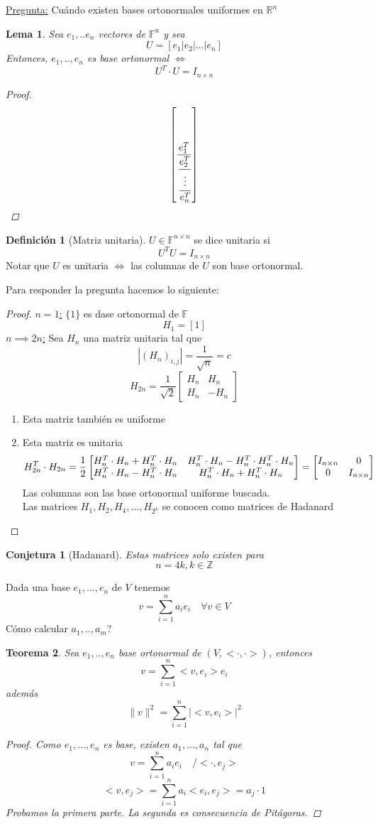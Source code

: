 \documentclass[11pt]{book}
\newcommand{\set}[1]{\mathbb{#1}}
\newtheorem{thm}{Teorema}[section]
\newtheorem{lem}[thm]{Lema}
\newtheorem*{conj}{Conjetura}
\theoremstyle{definition}
\newtheorem{defn}{Definición}[section]
\begin{document}
\underline{Pregunta:} Cuándo existen bases ortonormales uniformes en $\set{R}^n$
\begin{lem}
	Sea $e_1,..e_n$ vectores de $\set{F}^n$ y sea 
	\[U=\left[e_1|e_2|...|e_n\right]\]
	Entonces, $e_1,..,e_n$ es base ortonormal $\iff$
	\[U^T\cdot U=I_{n\times n}\]
	\begin{proof}
		\[\left[\frac{e_1^T}{\cfrac{e_2^T}{\cfrac{\vdots}{e_n^T}}}\right]\]
	\end{proof}
\end{lem}
\begin{defn}[Matriz unitaria]
	$U\in\set{F}^{n\times n}$ se dice unitaria si
	\[U^TU=I_{n\times n}\]
	Notar que $U$ es unitaria $\iff$ las columnas de $U$ son base ortonormal.
\end{defn}
Para responder la pregunta hacemos lo siguiente:
\begin{proof}
	\underline{$n=1$:} $\{1\}$ es dase ortonormal de $\set{F}$
	\[H_1=[1]\]
	\underline{$n\implies 2n$:} Sea $H_n$ una matriz unitaria tal que
	\[|(H_n)_{i,j}|=\frac{1}{\sqrt{n}}=c\]
	\[H_{2n}=\frac{1}{\sqrt{2}}\begin{bmatrix}
		H_n & H_n\\
		H_n & -H_n
	\end{bmatrix}\]
	\begin{enumerate}
		\item Esta matriz también es uniforme

		\item Esta matriz es unitaria
		\[H_{2n}^T\cdot H_{2n}=\frac{1}{2}\begin{bmatrix}
			H_n^T\cdot H_n+H_n^T\cdot H_n & H_n^T\cdot H_n-H_n^T\cdot H_n^T\cdot H_n\\
			H_n^T\cdot H_n-H_n^T\cdot H_n & H_n^T\cdot H_n+H_n^T\cdot H_n
		\end{bmatrix}=\begin{bmatrix}
			I_{n\times n} & 0\\
			0 & I_{n\times n}
		\end{bmatrix}\qedhere\]
		Las columnas son las base ortonormal uniforme buscada.\\
		Las matrices $H_1,H_2,H_4,...,H_{2^k}$ se conocen como matrices de Hadanard
	\end{enumerate}
\end{proof}
\begin{conj}[Hadanard]
	Estas matrices solo existen para
	\[n=4k,k\in\set{Z}\]
\end{conj}
Dada una base $e_1,...,e_n$ de $V$ tenemos
\[v=\sum^n_{i=1}a_ie_i\quad \forall v\in V\]
Cómo calcular $a_1,..,a_m$?
\begin{thm}
	Sea $e_1,..,e_n$ base ortonormal de $(V,<\cdot,\cdot>)$, entonces
	\[v=\sum^n_{i=1}<v,e_i>e_i\]
	además
	\[\|v\|^2=\sum^n_{i=1}|<v,e_i>|^2\]
	\begin{proof}
		Como $e_1,...,e_n$ es base, existen $a_1,...,a_n$ tal que\[v=\sum^n_{i=1}a_ie_i\quad /<\cdot,e_j>\]
		\[<v,e_j>=\sum^n_{i=1}a_i<e_i,e_j>=a_j\cdot 1\]
		Probamos la primera parte. La segunda es consecuencia de Pitágoras.
	\end{proof}
\end{thm}
\end{document}
